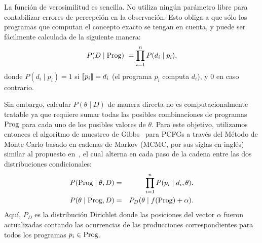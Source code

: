 
La función de verosimilitud es sencilla. No utiliza ningún parámetro libre para contabilizar errores de percepción en la observación. Esto obliga a que sólo los programas que computan el concepto exacto se tengan en cuenta, y puede ser fácilmente calculada de la siguiente manera:
%
\begin{equation*}
\label{eqD}
P(D \mid {\rm Prog})\ = \prod\limits_{i = 1}^n P(d_i \mid p_i),
\end{equation*}
%
donde $P(d_i \mid p_i) = 1 $ si $\llbracket p_i\rrbracket = d_i$ (el programa $p_i$ computa $d_i$), y 0 en caso contrario. 


Sin embargo, calcular $P(\theta \mid D)$ de manera directa no es computacionalmente tratable ya que requiere sumar todas las posibles combinaciones de programas ${\rm Prog}$ para cada uno de los posibles valores de $\theta$. Para este objetivo, utilizamos entonces el algoritmo de muestreo de Gibbs~\cite{geman1984stochastic} para PCFGs a través del Método de Monte Carlo basado en cadenas de Markov (MCMC, por sus siglas en inglés) similar al propuesto en~\cite{johnson2007bayesian}, el cual alterna en cada paso de la cadena entre las dos distribuciones condicionales: 
%
\begin{eqnarray*}
\label{eqE}
P({\rm Prog} \mid \theta, D) &=& \prod\limits_{i=1}^n P(p_i \mid d_i, \theta).\\
P(\theta \mid {\rm Prog}, D) &=& P_D(\theta \mid f({\rm Prog}) + \alpha).
\end{eqnarray*}
Aquí, $P_D$ es la distribución Dirichlet donde las posiciones del vector $\alpha$ fueron actualizadas contando las ocurrencias de las producciones correspondientes para todos los programas $p_i \in {\rm Prog}$.

